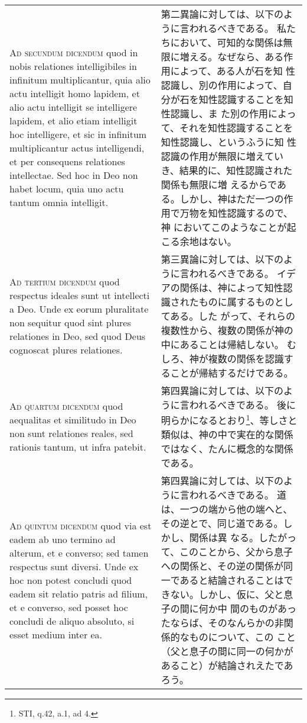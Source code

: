 \documentclass[10pt]{jsarticle} %
\begin{document}
\begin{longtable}{p{21em}p{21em}}
\\



{\scshape Ad secundum dicendum} quod in nobis relationes intelligibiles in
infinitum multiplicantur, quia alio actu intelligit homo lapidem, et
alio actu intelligit se intelligere lapidem, et alio etiam intelligit
hoc intelligere, et sic in infinitum multiplicantur actus intelligendi,
et per consequens relationes intellectae. Sed hoc in Deo non habet
locum, quia uno actu tantum omnia intelligit.


&

第二異論に対しては、以下のように言われるべきである。
私たちにおいて、可知的な関係は無限に増える。なぜなら、ある作用によって、ある人が石を知
 性認識し、別の作用によって、自分が石を知性認識することを知性認識し、ま
 た別の作用によって、それを知性認識することを知性認識し、というふうに知
 性認識の作用が無限に増えていき、結果的に、知性認識された関係も無限に増
 えるからである。しかし、神はただ一つの作用で万物を知性認識するので、神
 においてこのようなことが起こる余地はない。

\\



{\scshape Ad tertium dicendum} quod respectus ideales sunt ut intellecti a
Deo. Unde ex eorum pluralitate non sequitur quod sint plures relationes
in Deo, sed quod Deus cognoscat plures relationes.


&

第三異論に対しては、以下のように言われるべきである。
イデアの関係は、神によって知性認識されたものに属するものとしてある。した
 がって、それらの複数性から、複数の関係が神の中にあることは帰結しない。
 むしろ、神が複数の関係を認識することが帰結するだけである。


\\



{\scshape Ad quartum dicendum} quod aequalitas et similitudo in Deo non sunt
relationes reales, sed rationis tantum, ut infra patebit.


&

第四異論に対しては、以下のように言われるべきである。
後に明らかになるとおり\footnote{STI, q.42, a.1, ad 4.}、等しさと類似は、神の中で実在的な関係ではなく、たんに概念的な関係である。



\\




{\scshape Ad quintum dicendum} quod via est eadem ab uno termino ad alterum, et e
converso; sed tamen respectus sunt diversi. Unde ex hoc non potest
concludi quod eadem sit relatio patris ad filium, et e converso, sed
posset hoc concludi de aliquo absoluto, si esset medium inter ea.


&

第四異論に対しては、以下のように言われるべきである。
道は、一つの端から他の端へと、その逆とで、同じ道である。しかし、関係は異
 なる。したがって、このことから、父から息子への関係と、その逆の関係が同
 一であると結論されることはできない。しかし、仮に、父と息子の間に何か中
 間のものがあったならば、そのなんらかの非関係的なものについて、この
 こと（父と息子の間に同一の何かがあること）が結論されえたであろう。


\end{longtable}
\newpage
\end{document}
